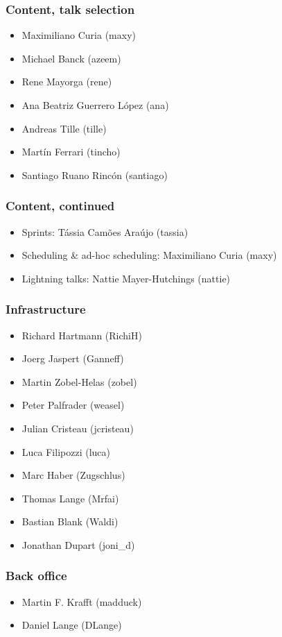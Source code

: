 \documentclass[t]{beamer}
\begin{document}
\begin{frame}
	\frametitle{Content, talk selection}
	\begin{itemize}
		\item Maximiliano Curia (maxy)
		\item Michael Banck (azeem)
		\item Rene Mayorga (rene)
		\item Ana Beatriz Guerrero López (ana)
		\item Andreas Tille (tille)
		\item Martín Ferrari (tincho)
		\item Santiago Ruano Rincón (santiago)
	\end{itemize}
\end{frame}

\begin{frame}
	\frametitle{Content, continued}
	\begin{itemize}
		\item Sprints: Tássia Camões Araújo (tassia)
		\item Scheduling \& ad-hoc scheduling: Maximiliano Curia (maxy)
		\item Lightning talks: Nattie Mayer-Hutchings (nattie)
	\end{itemize}
\end{frame}

\begin{frame}
	\frametitle{Infrastructure}
	\begin{itemize}
		\item Richard Hartmann (RichiH)
		\item Joerg Jaspert (Ganneff)
		\item Martin Zobel-Helas (zobel)
		\item Peter Palfrader (weasel)
		\item Julian Cristeau (jcristeau)
		\item Luca Filipozzi (luca)
		\item Marc Haber (Zugschlus)
		\item Thomas Lange (Mrfai)
		\item Bastian Blank (Waldi)
		\item Jonathan Dupart (joni\_d)
	\end{itemize}
\end{frame}

\begin{frame}
	\frametitle{Back office}
	\begin{itemize}
		\item Martin F. Krafft (madduck)
		\item Daniel Lange (DLange)
	\end{itemize}
\end{frame}
\end{document}
